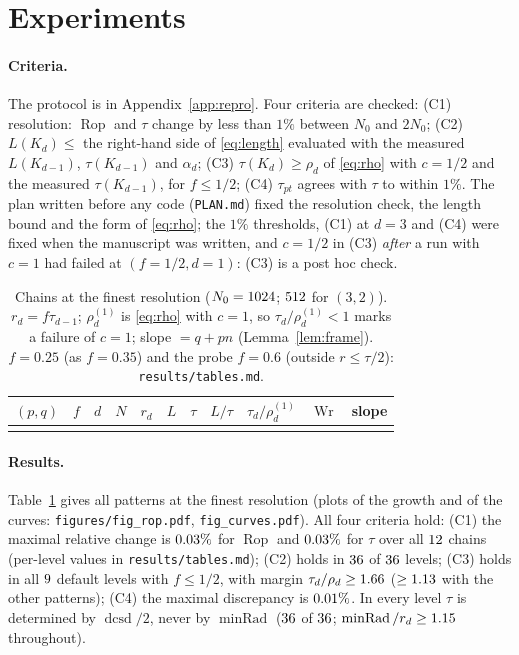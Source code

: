 \documentclass[10pt,a4paper]{article}
\theoremstyle{plain}
\theoremstyle{definition}
\theoremstyle{remark}
\newcommand{\Rop}{\operatorname{Rop}}
\newcommand{\Wr}{\operatorname{Wr}}
\newcommand{\minRad}{\operatorname{minRad}}
\newcommand{\dcsd}{\operatorname{dcsd}}
\begin{document}
\section{Experiments}\label{sec:exp}

\paragraph{Criteria.} The protocol is in Appendix~\ref{app:repro}. Four criteria are checked: (C1) resolution: $\Rop$ and $\tau$ change by less than $1\%$ between $N_0$ and $2N_0$; (C2) $L(K_d)\le$ the right-hand side of \eqref{eq:length} evaluated with the measured $L(K_{d-1})$, $\tau(K_{d-1})$ and $\alpha_d$; (C3) $\tau(K_d)\ge\rho_d$ of \eqref{eq:rho} with $c=1/2$ and the measured $\tau(K_{d-1})$, for $f\le1/2$; (C4) $\tau_{pt}$ agrees with $\tau$ to within $1\%$. The plan written before any code (\texttt{PLAN.md}) fixed the resolution check, the length bound and the form of \eqref{eq:rho}; the $1\%$ thresholds, (C1) at $d=3$ and (C4) were fixed when the manuscript was written, and $c=1/2$ in (C3) \emph{after} a run with $c=1$ had failed at $(f=1/2,d=1)$: (C3) is a post hoc check.

\begin{table}[!tbp]\centering\small
\caption{Chains at the finest resolution ($N_0=1024$; $512$ for $(3,2)$). $r_d=f\tau_{d-1}$; $\rho_d^{(1)}$ is \eqref{eq:rho} with $c=1$, so $\tau_d/\rho_d^{(1)}<1$ marks a failure of $c=1$; slope $=q+pn$ (Lemma~\ref{lem:frame}). $f=0.25$ (as $f=0.35$) and the probe $f=0.6$ (outside $r\le\tau/2$): \texttt{results/tables.md}.}\label{tab:main}
\begin{tabular}{@{}lrrrrrrrrrr@{}}\toprule
$(p,q)$ & $f$ & $d$ & $N$ & $r_d$ & $L$ & $\tau$ & $L/\tau$ & $\tau_d/\rho_d^{(1)}$ & $\Wr$ & slope\\\midrule
\\
\bottomrule\end{tabular}
\end{table}

\paragraph{Results.} Table~\ref{tab:main} gives all patterns at the finest resolution (plots of the growth and of the curves: \texttt{figures/fig\_rop.pdf}, \texttt{fig\_curves.pdf}). All four criteria hold: (C1) the maximal relative change is $0.03\%$ for $\Rop$ and $0.03\%$ for $\tau$ over all $12$ chains (per-level values in \texttt{results/tables.md}); (C2) holds in $36$ of $36$ levels; (C3) holds in all $9$ default levels with $f\le1/2$, with margin $\tau_d/\rho_d\ge1.66$ ($\ge1.13$ with the other patterns); (C4) the maximal discrepancy is $0.01\%$. In every level $\tau$ is determined by $\dcsd/2$, never by $\minRad$ ($36$ of $36$; $\minRad/r_d\ge\MinRadOverRMin$ throughout).
\end{document}
